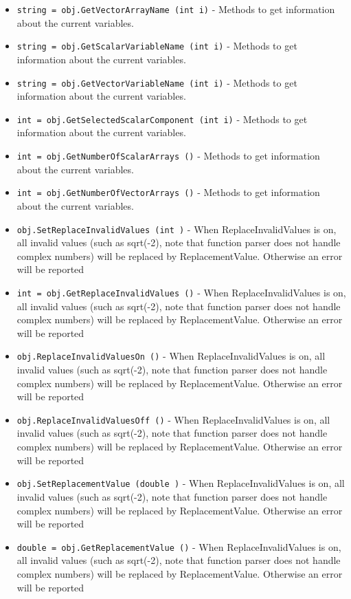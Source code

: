 \begin{itemize}
\item  \verb|string = obj.GetVectorArrayName (int i)| -  Methods to get information about the current variables.

\item  \verb|string = obj.GetScalarVariableName (int i)| -  Methods to get information about the current variables.

\item  \verb|string = obj.GetVectorVariableName (int i)| -  Methods to get information about the current variables.

\item  \verb|int = obj.GetSelectedScalarComponent (int i)| -  Methods to get information about the current variables.

\item  \verb|int = obj.GetNumberOfScalarArrays ()| -  Methods to get information about the current variables.

\item  \verb|int = obj.GetNumberOfVectorArrays ()| -  Methods to get information about the current variables.

\item  \verb|obj.SetReplaceInvalidValues (int )| -  When ReplaceInvalidValues is on, all invalid values (such as
 sqrt(-2), note that function parser does not handle complex
 numbers) will be replaced by ReplacementValue. Otherwise an
 error will be reported

\item  \verb|int = obj.GetReplaceInvalidValues ()| -  When ReplaceInvalidValues is on, all invalid values (such as
 sqrt(-2), note that function parser does not handle complex
 numbers) will be replaced by ReplacementValue. Otherwise an
 error will be reported

\item  \verb|obj.ReplaceInvalidValuesOn ()| -  When ReplaceInvalidValues is on, all invalid values (such as
 sqrt(-2), note that function parser does not handle complex
 numbers) will be replaced by ReplacementValue. Otherwise an
 error will be reported

\item  \verb|obj.ReplaceInvalidValuesOff ()| -  When ReplaceInvalidValues is on, all invalid values (such as
 sqrt(-2), note that function parser does not handle complex
 numbers) will be replaced by ReplacementValue. Otherwise an
 error will be reported

\item  \verb|obj.SetReplacementValue (double )| -  When ReplaceInvalidValues is on, all invalid values (such as
 sqrt(-2), note that function parser does not handle complex
 numbers) will be replaced by ReplacementValue. Otherwise an
 error will be reported

\item  \verb|double = obj.GetReplacementValue ()| -  When ReplaceInvalidValues is on, all invalid values (such as
 sqrt(-2), note that function parser does not handle complex
 numbers) will be replaced by ReplacementValue. Otherwise an
 error will be reported

\end{itemize}
